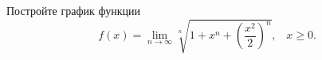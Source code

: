 \documentclass{article}
\begin{document}
Постройте график функции
$$f(x) = \lim\limits_{n\to \infty} \sqrt[n]{1 + x^n + \left( \frac{x^2}{2} \right)^n}, \;\;\; x \geqslant 0.$$
\end{document}
